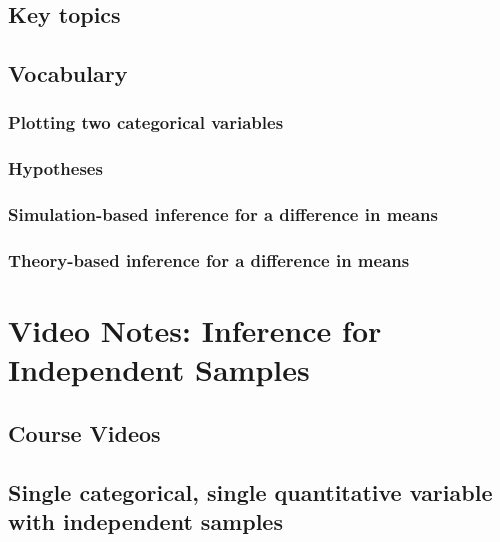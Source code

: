 \documentclass[
]{report}
\begin{document}
\subsection{Key topics}\label{key-topics-11}

\subsection{Vocabulary}\label{vocabulary-9}

\subsubsection*{Plotting two categorical variables}\label{plotting-two-categorical-variables-1}

\subsubsection*{Hypotheses}\label{hypotheses-1}

\subsubsection*{Simulation-based inference for a difference in means}\label{simulation-based-inference-for-a-difference-in-means}

\subsubsection*{Theory-based inference for a difference in means}\label{theory-based-inference-for-a-difference-in-means}

\section{Video Notes: Inference for Independent Samples}\label{video-notes-inference-for-independent-samples}

\subsection{Course Videos}\label{course-videos-9}

\subsection*{Single categorical, single quantitative variable with independent samples}\label{single-categorical-single-quantitative-variable-with-independent-samples}
\end{document}
